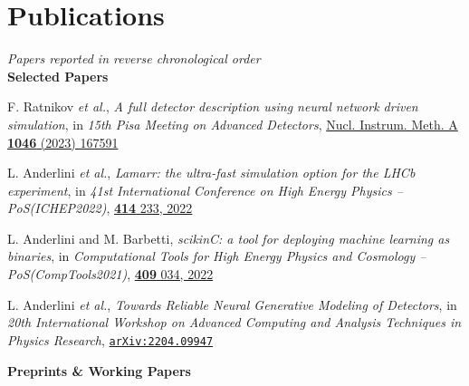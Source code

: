 \newcommand{\journal}[1]
  {\textbf{\large #1}\\\vspace{-5mm}}

\newcommand{\arxiv}[1]
  {\href{https://arxiv.org/abs/#1}{\texttt{arXiv:#1}}}


\section*{Publications}
\begin{cvcontent}
  \emph{Papers reported in reverse chronological order}\\[3mm]
 \journal{Selected Papers}
 \begin{enumerate}[label={[\arabic*]}, leftmargin=1.5cm]
    \item F. Ratnikov \emph{et al.},
    \emph{A full detector description using neural network driven simulation},
    in \emph{15th Pisa Meeting on Advanced Detectors},
    \href{https://doi.org/10.1016/j.nima.2022.167591}{Nucl. Instrum. Meth. A \textbf{1046} (2023) 167591}
    \item L. Anderlini \emph{et al.},
    \emph{Lamarr: the ultra-fast simulation option for the LHCb experiment},
    in \emph{41st International Conference on High Energy Physics -- PoS(ICHEP2022)},
    \href{https://doi.org/10.22323/1.414.0233}{\textbf{414} 233, 2022}
    \item L. Anderlini and M. Barbetti, 
    \emph{scikinC: a tool for deploying machine learning as binaries}, 
    in \emph{Computational Tools for High Energy Physics and Cosmology -- PoS(CompTools2021)}, 
    \href{https://doi.org/10.22323/1.409.0034}{\textbf{409} 034, 2022}
    \newpage\noindent
    \item L. Anderlini \emph{et al.},
    \emph{Towards Reliable Neural Generative Modeling of Detectors},
    in \emph{20th International Workshop on Advanced Computing and Analysis Techniques in Physics Research},
    \arxiv{2204.09947}
 \end{enumerate}
  \journal{Preprints \& Working Papers}
  \begin{enumerate}[label={[\arabic*]}, leftmargin=1.5cm]

\end{enumerate}
\end{cvcontent}
